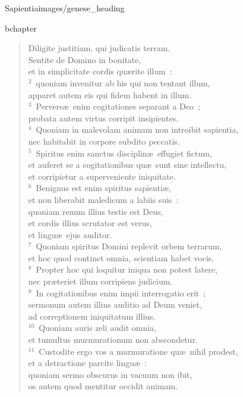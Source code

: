 {Sapientia}{images/genese_heading}

bchapter\begin{verse}\vspace{-11pt}Diligite justitiam, qui judicatis terram.\\ Sentite de Domino in bonitate,\\ et in simplicitate cordis qu\ae rite illum~:\\
${}^{2}$~quoniam invenitur ab his qui non tentant illum,\\ apparet autem eis qui fidem habent in illum.\\
${}^{3}$~Pervers\ae\ enim cogitationes separant a Deo~;\\ probata autem virtus corripit insipientes.\\
${}^{4}$~Quoniam in malevolam animam non introibit sapientia,\\ nec habitabit in corpore subdito peccatis.\\
${}^{5}$~Spiritus enim sanctus disciplin\ae\ effugiet fictum,\\ et auferet se a cogitationibus qu\ae\ sunt sine intellectu,\\ et corripietur a superveniente iniquitate.\\
${}^{6}$~Benignus est enim spiritus sapienti\ae ,\\ et non liberabit maledicum a labiis suis~:\\ quoniam renum illius testis est Deus,\\ et cordis illius scrutator est verus,\\ et lingu\ae\ ejus auditor.\\
${}^{7}$~Quoniam spiritus Domini replevit orbem terrarum,\\ et hoc quod continet omnia, scientiam habet vocis.\\
${}^{8}$~Propter hoc qui loquitur iniqua non potest latere,\\ nec pr\ae teriet illum corripiens judicium.\\
${}^{9}$~In cogitationibus enim impii interrogatio erit~;\\ sermonum autem illius auditio ad Deum veniet,\\ ad correptionem iniquitatum illius.\\
${}^{10}$~Quoniam auris zeli audit omnia,\\ et tumultus murmurationum non abscondetur.\\
${}^{11}$~Custodite ergo vos a murmuratione qu\ae\ nihil prodest,\\ et a detractione parcite lingu\ae~:\\ quoniam sermo obscurus in vacuum non ibit,\\ os autem quod mentitur occidit animam.\end{verse}


